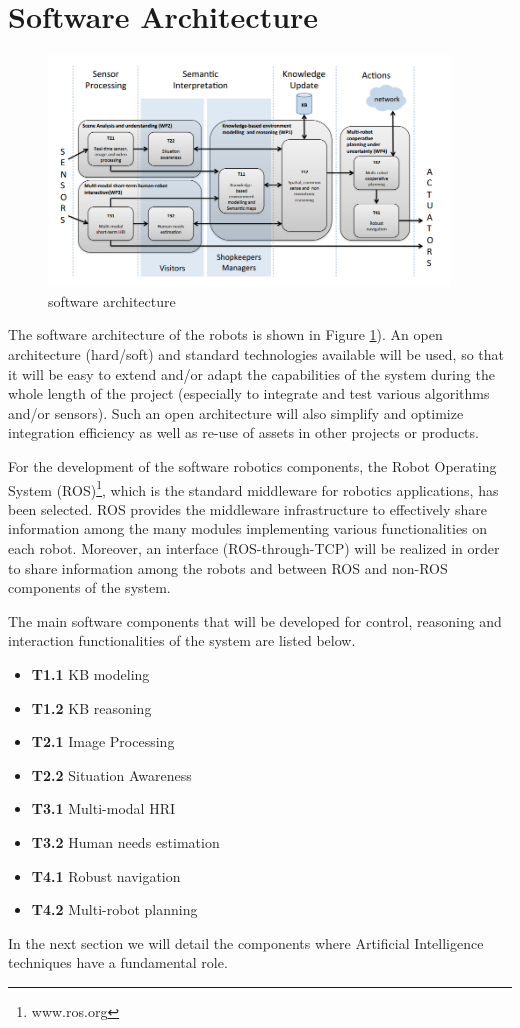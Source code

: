\section{Software Architecture}

\begin{figure}
\centering
\includegraphics[width=0.95\textwidth]{fig/COACHES_swarch.png}
\caption{\coaches software architecture}
\label{fig:swarch}
\end{figure}

The software architecture of the \coaches robots is shown in Figure \ref{fig:swarch}).
An open architecture (hard/soft) and standard technologies available will be used, 
so that it will be easy to extend and/or adapt the capabilities of the system during the whole length of 
the  project  (especially  to  integrate  and  test  various  algorithms  and/or  sensors).  
Such an open architecture will also simplify and optimize integration efficiency as well as re-use of assets in other projects or products. 


For the development of the software robotics components, the Robot Operating System (ROS)\footnote{www.ros.org}, which is the standard middleware for robotics applications, has been selected.
ROS provides the middleware infrastructure to effectively share information among the many modules implementing various functionalities on each robot. Moreover, an interface (ROS-through-TCP) will be realized in order to share information among the robots and between ROS and non-ROS components of the system.

The main software components that will be developed for control, reasoning and interaction functionalities of the system are listed below.

\begin{itemize}
\item {\bf T1.1} KB modeling
\item {\bf T1.2} KB reasoning
\item {\bf T2.1} Image Processing
\item {\bf T2.2} Situation Awareness
\item {\bf T3.1} Multi-modal HRI
\item {\bf T3.2} Human needs estimation
\item {\bf T4.1} Robust navigation %
\item {\bf T4.2} Multi-robot planning
\end{itemize}

In the next section we will detail the components where Artificial Intelligence techniques have a fundamental role.



